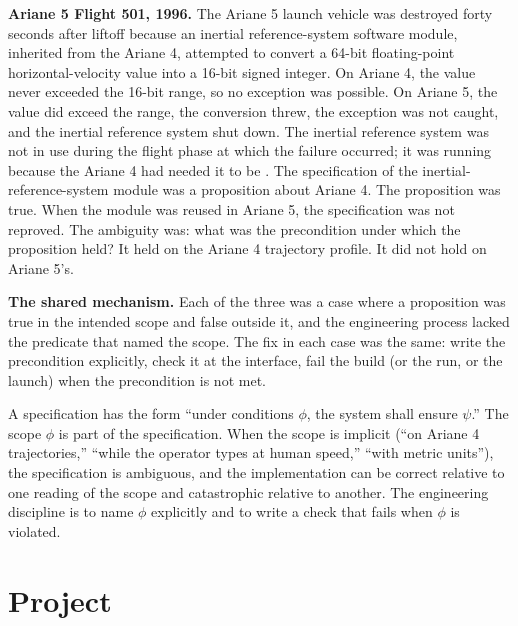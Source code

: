 \textbf{Ariane 5 Flight 501, 1996.} The Ariane 5 launch vehicle was destroyed forty seconds after liftoff because an inertial reference-system software module, inherited from the Ariane 4, attempted to convert a 64-bit floating-point horizontal-velocity value into a 16-bit signed integer. On Ariane 4, the value never exceeded the 16-bit range, so no exception was possible. On Ariane 5, the value did exceed the range, the conversion threw, the exception was not caught, and the inertial reference system shut down. The inertial reference system was not in use during the flight phase at which the failure occurred; it was running because the Ariane 4 had needed it to be \cite{acc:ariane501-ifr}. The specification of the inertial-reference-system module was a proposition about Ariane 4. The proposition was true. When the module was reused in Ariane 5, the specification was not reproved. The ambiguity was: what was the precondition under which the proposition held? It held on the Ariane 4 trajectory profile. It did not hold on Ariane 5's.

\textbf{The shared mechanism.} Each of the three was a case where a proposition was true in the intended scope and false outside it, and the engineering process lacked the predicate that named the scope. The fix in each case was the same: write the precondition explicitly, check it at the interface, fail the build (or the run, or the launch) when the precondition is not met.

\begin{principle}
A specification has the form ``under conditions $\phi$, the system shall ensure $\psi$.'' The scope $\phi$ is part of the specification. When the scope is implicit (``on Ariane 4 trajectories,'' ``while the operator types at human speed,'' ``with metric units''), the specification is ambiguous, and the implementation can be correct relative to one reading of the scope and catastrophic relative to another. The engineering discipline is to name $\phi$ explicitly and to write a check that fails when $\phi$ is violated.
\end{principle}

\section{Project}

